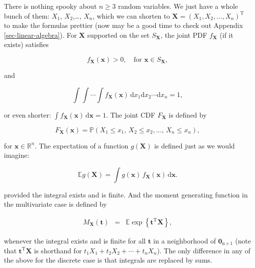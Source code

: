 \documentclass[]{book}
\numberwithin{equation}{chapter}
\numberwithin{figure}{chapter}
\theoremstyle{plain}
\theoremstyle{definition}
\theoremstyle{remark}
\theoremstyle{definition}
\theoremstyle{definition}
\theoremstyle{remark}
\begin{document}
There is nothing spooky about \(n\geq3\) random variables. We just have
a whole bunch of them: \(X_{1}\), \(X_{2}\),\ldots{}, \(X_{n}\), which
we can shorten to \(\mathbf{X}=(X_{1},X_{2},\ldots,X_{n})^{\mathrm{T}}\)
to make the formulas prettier (now may be a good time to check out
Appendix \ref{sec-linear-algebra}). For \(\mathbf{X}\) supported on the
set \(S_{\mathbf{X}}\), the joint PDF \(f_{\mathbf{X}}\) (if it exists)
satisfies

\begin{equation}
f_{\mathbf{X}}(\mathbf{x})>0,\quad \mbox{for }\mathbf{x}\in S_{\mathbf{X}},
\end{equation}

and

\begin{equation}
\int\!\!\!\int\cdots\int f_{\mathbf{X}}(\mathbf{x})\,\mathrm{d} x_{1}\mathrm{d} x_{2}\cdots\mathrm{d} x_{n}=1,
\end{equation}

or even shorter:
\(\int f_{\mathbf{X}}(\mathbf{x})\,\mathrm{d}\mathbf{x}=1\). The joint
CDF \(F_{\mathbf{X}}\) is defined by

\begin{equation}
F_{\mathbf{X}}(\mathbf{x})=\mathbb{P}(X_{1}\leq x_{1},\, X_{2}\leq x_{2},\ldots,\, X_{n}\leq x_{n}),
\end{equation}

for \(\mathbf{x}\in\mathbb{R}^{n}\). The expectation of a function
\(g(\mathbf{X})\) is defined just as we would imagine:

\begin{equation}
\mathbb{E} g(\mathbf{X})=\int g(\mathbf{x})\, f_{\mathbf{X}}(\mathbf{x})\,\mathrm{d}\mathbf{x}.
\end{equation}

provided the integral exists and is finite. And the moment generating
function in the multivariate case is defined by

\begin{eqnarray} 
M_{\mathbf{X}}(\mathbf{t}) & = & \mathbb{E}\exp\left\{ \mathbf{t}^{\mathrm{T}}\mathbf{X}\right\},
\end{eqnarray}

whenever the integral exists and is finite for all \(\mathbf{t}\) in a
neighborhood of \(\mathbf{0}_{\mathrm{n}\times1}\) (note that
\(\mathbf{t}^{\mathrm{T}}\mathbf{X}\) is shorthand for
\(t_{1}X_{1}+t_{2}X_{2}+\cdots+t_{n}X_{n}\)). The only difference in any
of the above for the discrete case is that integrals are replaced by
sums.
\end{document}
